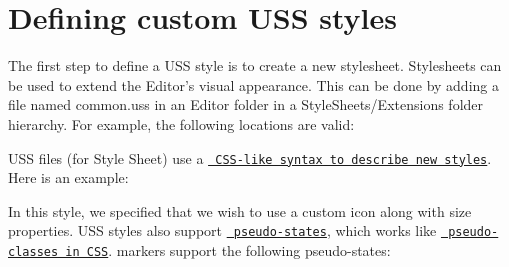 \chapter{Defining custom USS styles}
\hypertarget{md__hey_tea_9_2_library_2_package_cache_2com_8unity_8timeline_0d1_87_85_2_documentation_0i_2uss__styles}{}\label{md__hey_tea_9_2_library_2_package_cache_2com_8unity_8timeline_0d1_87_85_2_documentation_0i_2uss__styles}
\label{md__hey_tea_9_2_library_2_package_cache_2com_8unity_8timeline_0d1_87_85_2_documentation_0i_2uss__styles_autotoc_md4764}%
%
 The first step to define a USS style is to create a new stylesheet. Stylesheets can be used to extend the Editor’s visual appearance. This can be done by adding a file named {\ttfamily common.\+uss} in an Editor folder in a {\ttfamily Style\+Sheets/\+Extensions} folder hierarchy. For example, the following locations are valid\+:


\begin{DoxyCode}{0}

\end{DoxyCode}


USS files (for  Style Sheet) use a \href{https://docs.unity3d.com/Manual/UIE-USS.html}{\texttt{ CSS-\/like syntax to describe new styles}}. Here is an example\+:


\begin{DoxyCode}{0}
\DoxyCodeLine{\{}
\DoxyCodeLine{\}}

\end{DoxyCode}


In this style, we specified that we wish to use a custom icon along with size properties. USS styles also support \href{https://docs.unity3d.com/Manual/UIE-USS-Selectors.html}{\texttt{ pseudo-\/states}}, which works like \href{https://developer.mozilla.org/en-US/docs/Web/CSS/Pseudo-classes}{\texttt{ pseudo-\/classes in CSS}}.  markers support the following pseudo-\/states\+:


